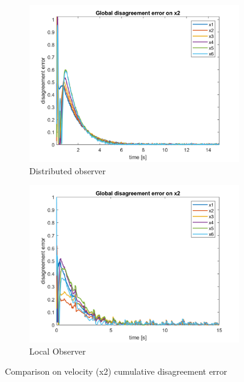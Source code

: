 \begin{figure}[H]
    \begin{subfigure}{0.45\textwidth}
        \centering
        \includegraphics[width=\textwidth]{img/dist/global_error_x2_noise_dist.png}
        \caption{Distributed observer}
    \end{subfigure}
    \hfill
    \begin{subfigure}{0.45\textwidth}
        \centering
        \includegraphics[width=\textwidth]{img/local/global_error_x2_noise_local.png}
        \caption{Local Observer}
    \end{subfigure}
    \caption{Comparison on velocity (x2) cumulative disagreement error}
    \label{fig:x2_error}
\end{figure}

